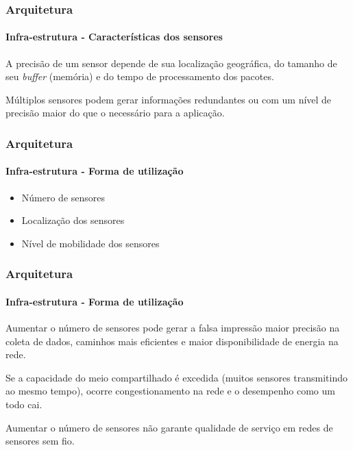 \documentclass[notes]{beamer}
\begin{document}
\begin{frame}
\frametitle{Arquitetura}
\framesubtitle{Infra-estrutura - Características dos sensores}

\begin{block}

A precisão de um sensor depende de sua localização geográfica, do tamanho de seu \textit{buffer} (memória) e do tempo de processamento dos pacotes. 

\end{block} \pause

\begin{alertblock}

Múltiplos sensores podem gerar informações redundantes ou com um nível de precisão maior do que o necessário para a aplicação. 

\end{alertblock}

\end{frame}

\begin{frame}
\frametitle{Arquitetura}
\framesubtitle{Infra-estrutura - Forma de utilização}

\begin{block}

\begin{itemize}

\item Número de sensores \pause
\item Localização dos sensores \pause
\item Nível de mobilidade dos sensores

\end{itemize}

\end{block}

\end{frame}

\begin{frame}
\frametitle{Arquitetura}
\framesubtitle{Infra-estrutura - Forma de utilização}

\begin{block}

Aumentar o número de sensores pode gerar a falsa impressão maior precisão na coleta de dados, caminhos mais eficientes e maior disponibilidade de energia na rede. 
\end{block} \pause

\begin{alertblock}

Se a capacidade do meio compartilhado é excedida (muitos sensores transmitindo ao mesmo tempo), ocorre congestionamento na rede e o desempenho como um todo cai.

\end{alertblock} \pause

\begin{alertblock}

Aumentar o número de sensores não garante qualidade de serviço em redes de sensores sem fio.

\end{alertblock}

\end{frame}
\end{document}
